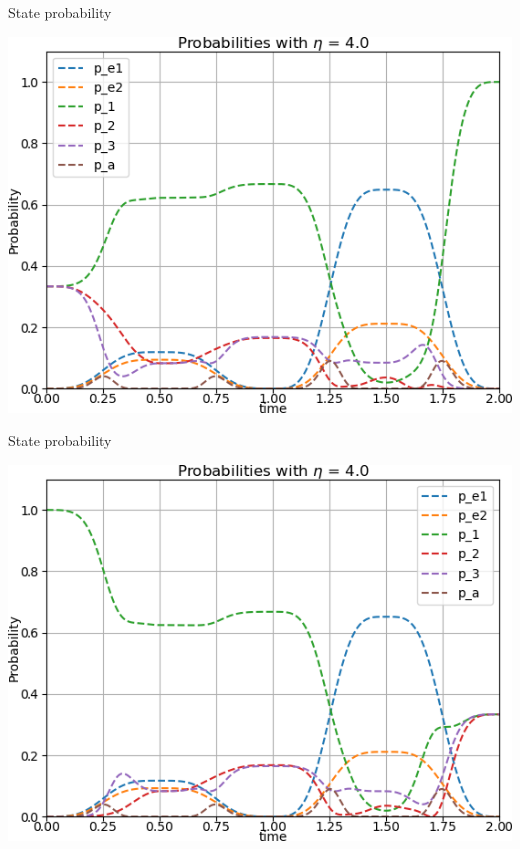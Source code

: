 \documentclass[t]{beamer}
\begin{document}
\begin{frame}{State probability}
\begin{center}
\includegraphics[scale=0.7]{pop_plot_H111.png}
\end{center}
\end{frame}

\begin{frame}{State probability}
\begin{center}
\includegraphics[scale=0.7]{pop_plot_H100.png}
\end{center}
\end{frame}
\end{document}

